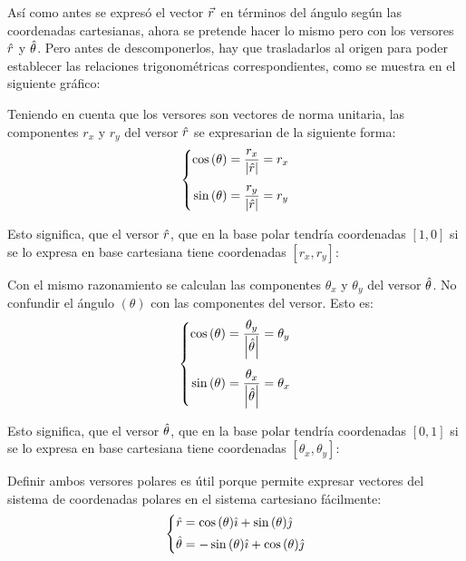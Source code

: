 \documentclass[a5paper,12pt,twoside]{book}
\begin{document}
Así como antes se expresó el vector $\vec{r}\hspace{0.05cm}$ en términos del ángulo según las coordenadas cartesianas, ahora se pretende hacer lo mismo pero con los versores $\hat{r}$ y $\hat{\theta}$.
Pero antes de descomponerlos, hay que trasladarlos al origen para poder establecer las relaciones trigonométricas correspondientes, como se muestra en el siguiente gráfico:

\begin{center}
    \def\svgwidth{0.5\linewidth}
    
\end{center}

Teniendo en cuenta que los versores son vectores de norma unitaria, las componentes $r_x$ y $r_y$ del versor $\hat{r}$ se expresarian de la siguiente forma:
\[
  \left\{
    \begin{aligned}
      \cos{(\theta)} &= \dfrac{r_x}{{\left| {\hat{r}} \right|}} = r_x
      \\[1ex]
      \sin{(\theta)} &= \dfrac{r_y}{{\left| {\hat{r}} \right|}} = r_y
    \end{aligned}
  \right.
\]

Esto significa, que el versor $\hat{r}$, que en la base polar tendría coordenadas $[1,0]$ si se lo expresa en base cartesiana tiene coordenadas $[r_x,r_y]$:

Con el mismo razonamiento se calculan las componentes $\theta_x$ y $\theta_y$ del versor $\hat{\theta}$. No confundir el ángulo $(\theta)$ con las componentes del versor. Esto es:
\[
\left\{
  \begin{aligned}
    \cos{(\theta)} &= \dfrac{\theta_y}{{\left| {\hat{\theta}} \right|}} = \theta_y
    \\[1ex]
    \sin{(\theta)} &= \dfrac{\theta_x}{{\left| {\hat{\theta}} \right|}} = \theta_x
  \end{aligned}
\right.
\]

Esto significa, que el versor $\hat{\theta}$, que en la base polar tendría coordenadas $[0,1]$ si se lo expresa en base cartesiana tiene coordenadas $[\theta_x,\theta_y]$:

Definir ambos versores polares es útil porque permite expresar vectores del sistema de coordenadas polares en el sistema cartesiano fácilmente:
\[
  \left\{
    \begin{aligned}
      \hat{r} &= \cos{(\theta)} \hat{\imath} + \sin{(\theta)} \hat{\jmath}
      \\
      \hat{\theta} &= -\sin{(\theta)} \hat{\imath} + \cos{(\theta)} \hat{\jmath}
    \end{aligned}
  \right.
\]
\end{document}
